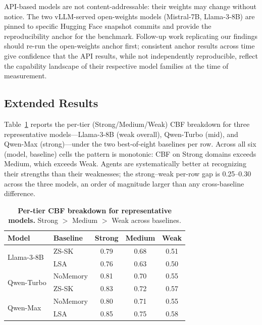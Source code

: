\documentclass[11pt]{article}
\begin{document}
API-based models are not content-addressable: their weights may change without notice. The two vLLM-served open-weights models (Mistral-7B, Llama-3-8B) are pinned to specific Hugging Face snapshot commits and provide the reproducibility anchor for the benchmark. Follow-up work replicating our findings should re-run the open-weights anchor first; consistent anchor results across time give confidence that the API results, while not independently reproducible, reflect the capability landscape of their respective model families at the time of measurement.


\subsection{Extended Results}
\label{app:extended}

Table~\ref{tab:tier_cbf} reports the per-tier (Strong/Medium/Weak) CBF breakdown for three representative models---Llama-3-8B (weak overall), Qwen-Turbo (mid), and Qwen-Max (strong)---under the two best-of-eight baselines per row. Across all six (model, baseline) cells the pattern is monotonic: CBF on Strong domains exceeds Medium, which exceeds Weak. Agents are systematically better at recognizing their strengths than their weaknesses; the strong--weak per-row gap is 0.25--0.30 across the three models, an order of magnitude larger than any cross-baseline difference.

\begin{table}[h]
\centering
\caption{\textbf{Per-tier CBF breakdown for representative models.} Strong $>$ Medium $>$ Weak across baselines.}
\label{tab:tier_cbf}
\vspace{0.5em}
\small
\begin{tabular}{@{}llccc@{}}
\toprule
\textbf{Model} & \textbf{Baseline} & \textbf{Strong} & \textbf{Medium} & \textbf{Weak} \\
\midrule
\multirow{2}{*}{Llama-3-8B}
 & ZS-SK   & 0.79 & 0.68 & 0.51 \\
 & LSA & 0.76 & 0.63 & 0.50 \\
\midrule
\multirow{2}{*}{Qwen-Turbo}
 & NoMemory      & 0.81 & 0.70 & 0.55 \\
 & ZS-SK   & 0.83 & 0.72 & 0.57 \\
\midrule
\multirow{2}{*}{Qwen-Max}
 & NoMemory      & 0.80 & 0.71 & 0.55 \\
 & LSA & 0.85 & 0.75 & 0.58 \\
\bottomrule
\end{tabular}
\end{table}
\end{document}

